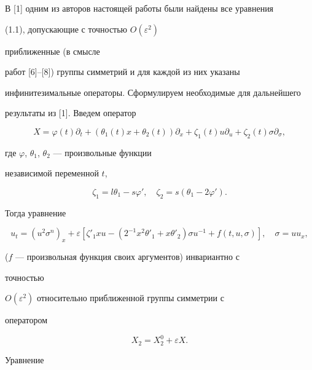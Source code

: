 В [1] одним из авторов настоящей работы были найдены все уравнения


(1.1), допускающие с точностью $O(\varepsilon^2)$


приближенные (в смысле


работ [6]--[8]) группы симметрий и для каждой из них указаны


инфинитезимальные операторы. Сформулируем необходимые для дальнейшего


результаты из [1]. Введем оператор


\begin{equation}


X=\varphi(t)\partial_t+(\theta_1(t)x+\theta_2(t))\partial_x+


\zeta_1(t)u\partial_u+\zeta_2(t)\sigma\partial_\sigma, \tag{2.7}


\end{equation}


где $\varphi$, $\theta_1$, $\theta_2$ --- произвольные функции


независимой переменной $t$,


\begin{equation}


\zeta_1=l\theta_1-s\varphi',\quad


\zeta_2=s(\theta_1-2\varphi').\tag{2.8}


\end{equation}


Тогда уравнение


\begin{equation}


u_t=(u^2\sigma^n)_x+\varepsilon[\zeta'_1xu-


(2^{-1}x^2\theta'_1+x\theta'_2)\sigma u^{-1}+


f(t,u,\sigma)],\quad \sigma=uu_x, \tag{2.9}


\end{equation}


($f$ --- произвольная функция своих аргументов) инвариантно с


точностью


$O(\varepsilon^2)$ относительно приближенной группы симметрии с


оператором


\begin{equation}


X_2=X^0_2+\varepsilon X.\tag{2.10}


\end{equation}


Уравнение


